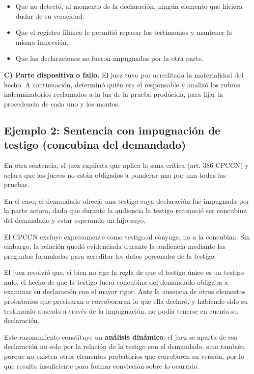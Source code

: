 \documentclass[12pt,oneside]{book}
\begin{document}
\begin{itemize}
    \item Que no detectó, al momento de la declaración, ningún elemento que hiciera dudar de su veracidad.
    \item Que el registro fílmico le permitió repasar los testimonios y mantener la misma impresión.
    \item Que las declaraciones no fueron impugnadas por la otra parte.
\end{itemize}

\textbf{C) Parte dispositiva o fallo.} El juez tuvo por acreditada la materialidad del hecho. A continuación, determinó quién era el responsable y analizó los rubros indemnizatorios reclamados a la luz de la prueba producida, para fijar la procedencia de cada uno y los montos.

\subsection{Ejemplo 2: Sentencia con impugnación de testigo (concubina del demandado)}

En otra sentencia, el juez explicita que aplica la sana crítica (art. 386 CPCCN) y aclara que los jueces no están obligados a ponderar una por una todas las pruebas.

En el caso, el demandado ofreció una testigo cuya declaración fue impugnada por la parte actora, dado que durante la audiencia la testigo reconoció ser concubina del demandado y estar esperando un hijo suyo.

\begin{note}
El CPCCN excluye expresamente como testigo al cónyuge, no a la concubina. Sin embargo, la relación quedó evidenciada durante la audiencia mediante las preguntas formuladas para acreditar los datos personales de la testigo.
\end{note}

El juez resolvió que, si bien no rige la regla de que el testigo único es un testigo nulo, el hecho de que la testigo fuera concubina del demandado obligaba a examinar su declaración con el mayor rigor. Ante la ausencia de otros elementos probatorios que precisaran o corroboraran lo que ella declaró, y habiendo sido su testimonio atacado a través de la impugnación, no podía tenerse en cuenta su declaración.

Este razonamiento constituye un \textbf{análisis dinámico}: el juez se aparta de esa declaración no solo por la relación de la testigo con el demandado, sino también porque no existen otros elementos probatorios que corroboren su versión, por lo que resulta insuficiente para formar convicción sobre lo ocurrido.
\end{document}
